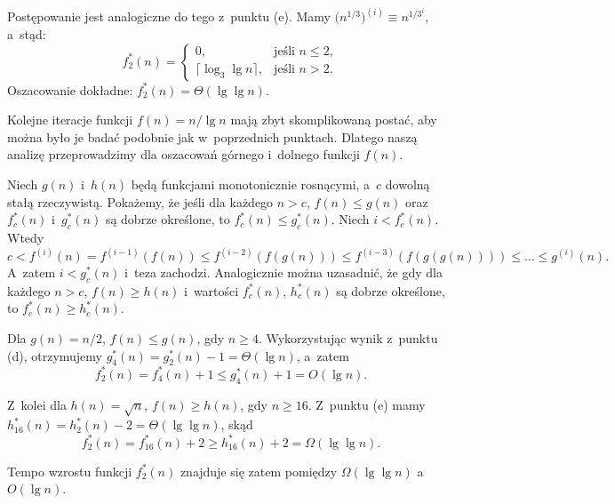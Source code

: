 \subproblem %
Postępowanie jest analogiczne do tego z~punktu (e).
Mamy $\bigl(n^{1/3}\bigr)^{(i)}\equiv n^{1/3^i}$, a~stąd:
\[
	f_2^*(n) =
	\begin{cases}
		0, & \text{jeśli $n\le2$}, \\
		\lceil\log_3\lg n\rceil, & \text{jeśli $n>2$}.
	\end{cases}
\]
Oszacowanie dokładne: $f_2^*(n)=\Theta(\lg\lg n)$.

\subproblem %
Kolejne iteracje funkcji $f(n)=n/\!\lg n$ mają zbyt skomplikowaną postać, aby można było je badać podobnie jak w~poprzednich punktach.
Dlatego naszą analizę przeprowadzimy dla oszacowań górnego i~dolnego funkcji $f(n)$.

Niech $g(n)$ i~$h(n)$ będą funkcjami monotonicznie rosnącymi, a~$c$ dowolną stałą rzeczywistą.
Pokażemy, że jeśli dla każdego $n>c$, $f(n)\le g(n)$ oraz $f_c^*(n)$ i~$g_c^*(n)$ są dobrze określone, to $f_c^*(n)\le g_c^*(n)$.
Niech $i<f_c^*(n)$.
Wtedy
\[
	c < f^{(i)}(n) = f^{(i-1)}(f(n)) \le f^{(i-2)}(f(g(n))) \le f^{(i-3)}(f(g(g(n)))) \le \dots \le g^{(i)}(n).
\]
A~zatem $i<g_c^*(n)$ i~teza zachodzi.
Analogicznie można uzasadnić, że gdy dla każdego $n>c$, $f(n)\ge h(n)$ i~wartości $f_c^*(n)$, $h_c^*(n)$ są dobrze określone, to $f_c^*(n)\ge h_c^*(n)$.

Dla $g(n)=n/2$, $f(n)\le g(n)$, gdy $n\ge4$.
Wykorzystując wynik z~punktu (d), otrzymujemy $g_4^*(n)=g_2^*(n)-1=\Theta(\lg n)$, a~zatem
\[
	f_2^*(n) = f_4^*(n)+1 \le g_4^*(n)+1 = O(\lg n).
\]

Z~kolei dla $h(n)=\sqrt{n}$, $f(n)\ge h(n)$, gdy $n\ge16$.
Z~punktu (e) mamy $h_{16}^*(n)=h_2^*(n)-2=\Theta(\lg\lg n)$, skąd
\[
	f_2^*(n) = f_{16}^*(n)+2 \ge h_{16}^*(n)+2 = \Omega(\lg\lg n).
\]

Tempo wzrostu funkcji $f_2^*(n)$ znajduje się zatem pomiędzy $\Omega(\lg\lg n)$ a~$O(\lg n)$.
